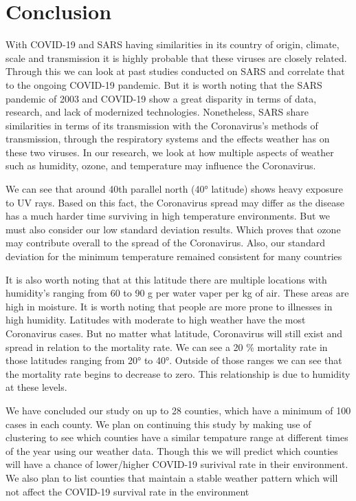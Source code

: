 \documentclass[10pt,journal,compsoc]{IEEEtran}
\begin{document}
{{{\section{Conclusion}
\label{sec: conclusion}

	With COVID-19 and SARS having similarities in its country of origin, climate, scale and transmission it is highly probable that these viruses are closely related. Through this we can look at past studies conducted on SARS and correlate that to the ongoing COVID-19 pandemic. But it is worth noting that the SARS pandemic of 2003 and COVID-19 show a great disparity in terms of data, research, and lack of modernized technologies. Nonetheless, SARS share similarities in terms of its transmission with the Coronavirus’s methods of transmission, through the respiratory systems and the effects weather has on these two viruses. In our research, we look at how multiple aspects of weather such as humidity, ozone, and temperature may influence the Coronavirus.

	We can see that around 40th parallel north (40° latitude) shows heavy exposure to UV rays. Based on this fact, the Coronavirus spread may differ as the disease has a much harder time surviving in high temperature environments. But we must also consider our low standard deviation results. Which proves that ozone may contribute overall to the spread of the Coronavirus. Also, our standard deviation for the minimum temperature remained consistent for many countries

	It is also worth noting that at this latitude there are multiple locations with humidity’s ranging from 60 to 90 g per water vaper per kg of air. These areas are high in moisture. It is worth noting that people are more prone to illnesses in high humidity. Latitudes with moderate to high weather have the most Coronavirus cases. But no matter what latitude, Coronavirus will still exist and spread in relation to the mortality rate. We can see a 20 \% mortality rate in those latitudes ranging from 20° to 40°. Outside of those ranges we can see that the mortality rate begins to decrease to zero. This relationship is due to humidity at these levels.

	We have concluded our study on up to 28 counties, which have a minimum of 100 cases in each county. We plan on continuing this study by making use of clustering to see which counties have a similar tempature range at different times of the year using our weather data. Though this we will predict which counties will have a chance of lower/higher COVID-19 surivival rate in their environment. We also plan to list counties that maintain a stable weather pattern which will not affect the COVID-19 survival rate in the environment

}}}
\end{document}
